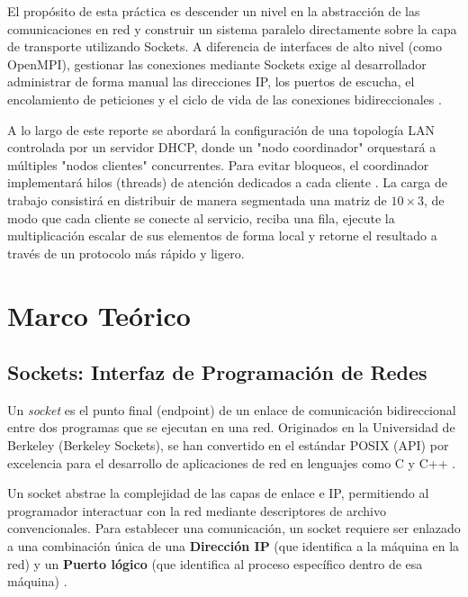 El propósito de esta práctica es descender un nivel en la abstracción de las comunicaciones en red y construir un sistema paralelo directamente sobre la capa de transporte utilizando Sockets. A diferencia de interfaces de alto nivel (como OpenMPI), gestionar las conexiones mediante Sockets exige al desarrollador administrar de forma manual las direcciones IP, los puertos de escucha, el encolamiento de peticiones y el ciclo de vida de las conexiones bidireccionales \cite{sosa2017}. 

A lo largo de este reporte se abordará la configuración de una topología LAN controlada por un servidor DHCP, donde un "nodo coordinador" orquestará a múltiples "nodos clientes" concurrentes. Para evitar bloqueos, el coordinador implementará hilos (threads) de atención dedicados a cada cliente \cite{cisco2023}. La carga de trabajo consistirá en distribuir de manera segmentada una matriz de $10 \times 3$, de modo que cada cliente se conecte al servicio, reciba una fila, ejecute la multiplicación escalar de sus elementos de forma local y retorne el resultado a través de un protocolo más rápido y ligero.

\section{Marco Teórico}

\subsection{Sockets: Interfaz de Programación de Redes}
Un \textit{socket} es el punto final (endpoint) de un enlace de comunicación bidireccional entre dos programas que se ejecutan en una red. Originados en la Universidad de Berkeley (Berkeley Sockets), se han convertido en el estándar POSIX (API) por excelencia para el desarrollo de aplicaciones de red en lenguajes como C y C++ \cite{sosa2017}.

Un socket abstrae la complejidad de las capas de enlace e IP, permitiendo al programador interactuar con la red mediante descriptores de archivo convencionales. Para establecer una comunicación, un socket requiere ser enlazado a una combinación única de una \textbf{Dirección IP} (que identifica a la máquina en la red) y un \textbf{Puerto lógico} (que identifica al proceso específico dentro de esa máquina) \cite{tanenbaum2012}.

